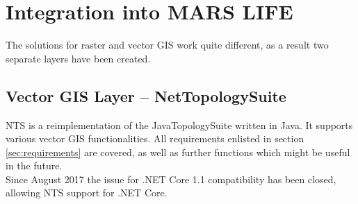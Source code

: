 \section{Integration into MARS LIFE}
The solutions for raster and vector GIS work quite different, as a result two separate layers have been created.


\subsection{Vector GIS Layer -- NetTopologySuite}
NTS is a reimplementation of the JavaTopologySuite written in Java. It supports various vector GIS functionalities. All requirements enlisted in section \ref{sec:requirements} are covered, as well as further functions which might be useful in the future.\\
Since August 2017 the issue for .NET Core 1.1 compatibility has been closed, allowing NTS support for .NET Core.


